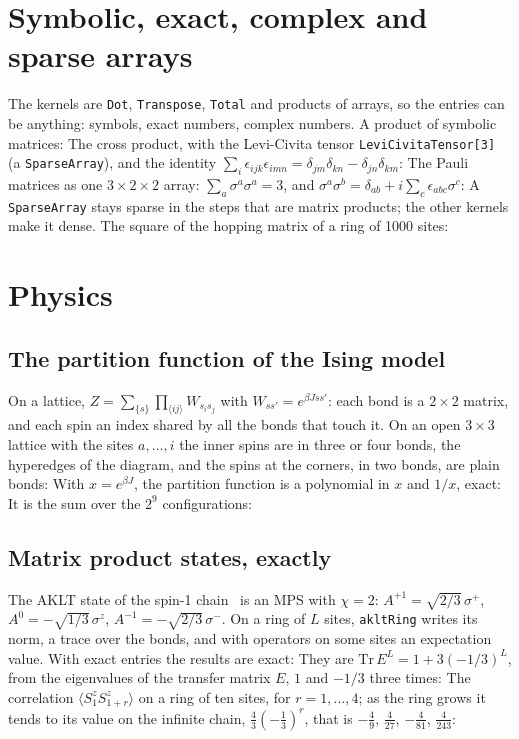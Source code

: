 \documentclass[11pt,a4paper]{article}
\begin{document}
\section{Symbolic, exact, complex and sparse arrays}
The kernels are \texttt{Dot}, \texttt{Transpose}, \texttt{Total} and products of arrays, so the entries can be anything:
symbols, exact numbers, complex numbers. A product of symbolic matrices:
The cross product, with the Levi-Civita tensor \texttt{LeviCivitaTensor[3]} (a \texttt{SparseArray}), and the identity
$\sum_i\epsilon_{ijk}\epsilon_{imn}=\delta_{jm}\delta_{kn}-\delta_{jn}\delta_{km}$:
The Pauli matrices as one $3\times2\times2$ array: $\sum_a\sigma^a\sigma^a=3$, and
$\sigma^a\sigma^b=\delta_{ab}+i\sum_c\epsilon_{abc}\sigma^c$:
A \texttt{SparseArray} stays sparse in the steps that are matrix products; the other kernels make it dense. The square of
the hopping matrix of a ring of 1000 sites:

\section{Physics}

\subsection{The partition function of the Ising model}
On a lattice, $Z=\sum_{\{s\}}\prod_{\langle ij\rangle}W_{s_is_j}$ with $W_{ss'}=e^{\beta Jss'}$: each bond is a $2\times2$
matrix, and each spin an index shared by all the bonds that touch it. On an open $3\times3$ lattice with the sites
$a,\dots,i$ the inner spins are in three or four bonds, the hyperedges of the diagram, and the spins at the corners, in
two bonds, are plain bonds:
With $x=e^{\beta J}$, the partition function is a polynomial in $x$ and $1/x$, exact:
It is the sum over the $2^9$ configurations:

\subsection{Matrix product states, exactly}
The AKLT state of the spin-1 chain~\cite{AKLT87} is an MPS with $\chi=2$: $A^{+1}=\sqrt{2/3}\,\sigma^+$,
$A^0=-\sqrt{1/3}\,\sigma^z$, $A^{-1}=-\sqrt{2/3}\,\sigma^-$. On a ring of $L$ sites, \texttt{akltRing} writes its norm, a
trace over the bonds, and with operators on some sites an expectation value. With exact entries the results are exact:
They are $\mathrm{Tr}\,E^L=1+3(-1/3)^L$, from the eigenvalues of the transfer matrix $E$, $1$ and $-1/3$ three times:
The correlation $\langle S^z_1S^z_{1+r}\rangle$ on a ring of ten sites, for $r=1,\dots,4$; as the ring grows it tends to
its value on the infinite chain, $\frac43(-\frac13)^r$, that is $-\frac49$, $\frac4{27}$, $-\frac4{81}$, $\frac4{243}$:
\end{document}
